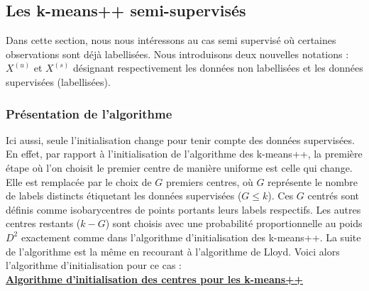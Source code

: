 \documentclass[12pt,a4paper]{book}
\newcommand{\1}{\mathds{1}}
\begin{document}
\subsection{Les k-means++ semi-supervisés}

Dans cette section, nous nous intéressons au cas semi supervisé où certaines observations sont déjà labellisées. Nous introduisons deux nouvelles notations : $X^{(u)}$ et $X^{(s)}$ désignant respectivement les données non labellisées et les données supervisées (labellisées). 
	
\subsubsection{Présentation de l'algorithme}

Ici aussi, seule l'initialisation change pour tenir compte des données supervisées. En effet, par rapport à l'initialisation de l'algorithme des k-means++, la première étape où l'on choisit le premier centre de manière uniforme est celle qui change. Elle est remplacée par le choix de $G$ premiers centres, où $G$ représente le nombre de labels distincts étiquetant les données supervisées ($G \leq k$). Ces $G$ centrés sont définis comme isobarycentres de points portants leurs labels respectifs. Les autres centres restants ($k-G$) sont choisis avec une probabilité proportionnelle au poids $D^2$ exactement comme dans l'algorithme d'initialisation des k-means++.   La suite de l'algorithme est la même en recourant à l'algorithme de Lloyd. Voici alors l'algorithme d'initialisation pour ce cas : \\

\noindent \textbf{\underline{Algorithme d'initialisation des centres pour les k-means++}}\label{algo_ss_kmeans_pp}
\end{document}
